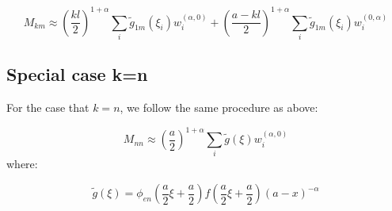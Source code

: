 \documentclass{article}
\begin{document}
\begin{equation}
    M_{km} \approx \left(\frac{kl}{2}\right)^{1+\alpha} \sum_{i}\tilde g_{1m}(\xi_i) w_i^{(\alpha,0)}+ \left(\frac{a-kl}{2}\right)^{1 + \alpha} \sum_i\tilde g_{1m}(\xi_i) w_i^{(0,\alpha)}
\end{equation}

\subsection*{Special case k=n}

For the case that $k=n$, we follow the same procedure as above:

\begin{equation}
    M_{nn} \approx \left(\frac{a}{2}\right)^{1+\alpha} \sum_i \tilde g(\xi) w_i^{(\alpha, 0)}
\end{equation}
where:

\begin{equation}
    \tilde g(\xi) = \phi_{en}\left(\frac{a}{2}\xi + \frac{a}{2}\right)f\left(\frac{a}{2}\xi + \frac{a}{2}\right)(a-x)^{-\alpha}
\end{equation}
\end{document}
